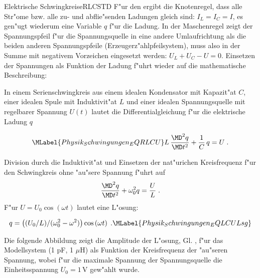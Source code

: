 \begin{MXContent}{Elektrische Schwingkreise}{RLC}{STD}
F"ur den  ergibt die Knotenregel, dass alle Str"ome bzw. alle zu- und abflie"senden Ladungen gleich sind: $I_L=I_C=I$, es gen"ugt wiederum eine Variable $q$ f"ur die Ladung. In der Maschenregel zeigt der Spannungspfeil f"ur die Spannungsquelle in eine andere Umlaufrichtung als die beiden anderen Spannungspfeile (Erzeugerz"ahlpfeilsystem), muss also in der Summe mit negativem Vorzeichen eingesetzt werden: $U_L+U_C-U=0$. Einsetzen der Spannungen als Funktion der Ladung f"uhrt wieder auf die mathematische Beschreibung:

\begin{MInfo}
In einem Serienschwingkreis aus einem idealen Kondensator mit Kapazit"at $C$, einer idealen Spule mit Induktivit"at $L$ und einer idealen Spannungsquelle mit regelbarer Spannung $U(t)$ lautet die Differentialgleichung f"ur die elektrische Ladung $q$

\begin{equation}\MLabel{Physik_Schwingungen_EQRLCU}
  L\, \frac{\MD^2 q }{\MD t^2} + \frac{1}{C}\, q = U \; .
\end{equation}

Division durch die Induktivit"at und Einsetzen der nat"urichen Kreisfrequenz f"ur den Schwingkreis ohne "au"sere Spannung f"uhrt auf 
\begin{equation}
  \frac{\MD^2 q }{\MD t^2} + \omega_0^2 q = \frac{U}{L} \; .
\end{equation}
F"ur $U=U_0\cos\left(\omega t\right)$ lautet eine L"osung:

\begin{equation}
  q = \left((U_0/L)/(\omega_0^2-\omega^2)\right) \cos\left(\omega t\right) \; .\MLabel{Physik_Schwingungen_EQLCULsg}
\end{equation}

\end{MInfo}


\begin{MExample}
Die folgende Abbildung zeigt die Amplitude der L"osung, Gl. , f"ur das Modellsystem (1 pF, 1 $\mu$H) als Funktion der Kreisfrequenz der "au"seren Spannung, wobei f"ur die maximale Spannung der Spannungsquelle die Einheitsspannung $U_0=1 \,\text{V}$ gew"ahlt wurde.

\begin{center}
\end{center}


\end{MExample}
\end{MXContent}
